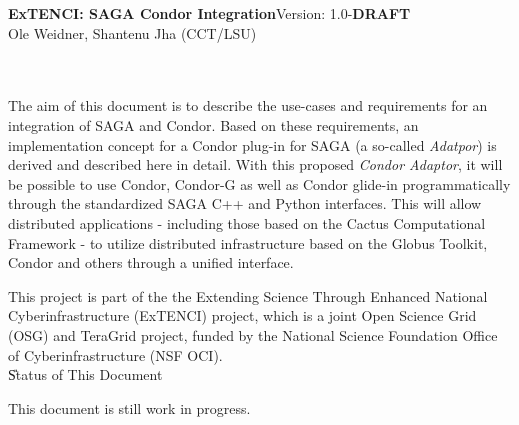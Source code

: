 \newif\ifdraft
\drafttrue                                                                                                   
\ifdraft
\newcommand{\llnote}[1]{ {\textcolor{green} { ***JK: #1 }}}
\newcommand{\alnote}[1]{ {\textcolor{blue} { ***AL: #1 }}}
\newcommand{\jhanote}[1]{ {\textcolor{red} { ***SJ: #1 }}}
\else
\newcommand{\llnote}[1]{}
\newcommand{\alnote}[1]{}
\newcommand{\jhanote}[1]{}
\fi


\newcommand{\sagadocument}{ExTENCI: SAGA Condor Integration}
\newcommand{\sagaversion}{1.0-\textbf{DRAFT}}
\newcommand{\sagabasename}{saga-programming-guide}
\newcommand{\sagaemail}{\{oweidner|sjha\} @ cct.lsu.edu}



\newcommand{\name}{\F{SAGA}\xspace}
\DefineShortVerb{\|}



 \thispagestyle{empty}

  \textbf{\sagadocument}\hfill  Version: \sagaversion\\
  Ole Weidner, Shantenu Jha (CCT/LSU) \hfill {\sagadate} 

  \hrulefill\\[2em]

  \\[4em]

   The aim of this document is to describe the use-cases and
   requirements for an integration of SAGA and Condor. Based on these
   requirements, an implementation concept for a Condor plug-in for SAGA
   (a so-called \textit{Adatpor}) is  derived and described here in
   detail. With this proposed \textit{Condor Adaptor}, it will be
   possible to use Condor, Condor-G as well as Condor glide-in
   programmatically through the standardized SAGA C++ and Python
   interfaces. This will allow distributed applications - including
   those based on the Cactus Computational Framework - to utilize
   distributed infrastructure based on the Globus Toolkit, Condor and
   others through a unified interface.

   This project is part of the the Extending Science Through Enhanced
   National Cyberinfrastructure (ExTENCI) project, which is a joint Open
   Science Grid (OSG) and TeraGrid project, funded by the National
   Science Foundation Office of Cyberinfrastructure (NSF OCI). \\[2em]


  \U{Status of This Document}

  This document is still work in progress.\\
  
